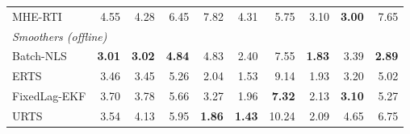 \begin{longtable}{lrrrrrrrrr}
\quad MHE-RTI & 4.55 & 4.28 & 6.45 & 7.82 & 4.31 & 5.75 & 3.10 & \textbf{3.00} & 7.65 \\
\multicolumn{10}{l}{\textit{Smoothers (offline)}} \\
\quad Batch-NLS & \textbf{3.01} & \textbf{3.02} & \textbf{4.84} & 4.83 & 2.40 & 7.55 & \textbf{1.83} & 3.39 & \textbf{2.89} \\
\quad ERTS & 3.46 & 3.45 & 5.26 & 2.04 & 1.53 & 9.14 & 1.93 & 3.20 & 5.02 \\
\quad FixedLag-EKF & 3.70 & 3.78 & 5.66 & 3.27 & 1.96 & \textbf{7.32} & 2.13 & \textbf{3.10} & 5.27 \\
\quad URTS & 3.54 & 4.13 & 5.95 & \textbf{1.86} & \textbf{1.43} & 10.24 & 2.09 & 4.65 & 6.75 \\
\bottomrule\end{longtable}\endgroup
